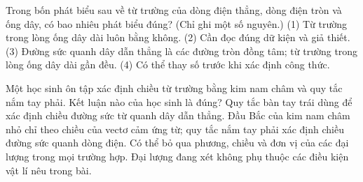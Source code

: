 \begin{ex}
Trong bốn phát biểu sau về từ trường của dòng điện thẳng, dòng điện tròn và ống dây, có bao nhiêu phát biểu đúng? (Chỉ ghi một số nguyên.) (1) Từ trường trong lòng ống dây dài luôn bằng không. (2) Cần đọc đúng dữ kiện và giả thiết. (3) Đường sức quanh dây dẫn thẳng là các đường tròn đồng tâm; từ trường trong lòng ống dây dài gần đều. (4) Có thể thay số trước khi xác định công thức.
\end{ex}

\begin{ex}
Một học sinh ôn tập xác định chiều từ trường bằng kim nam châm và quy tắc nắm tay phải. Kết luận nào của học sinh là đúng?
\choice
{Quy tắc bàn tay trái dùng để xác định chiều đường sức từ quanh dây dẫn thẳng.}
{\True Đầu Bắc của kim nam châm nhỏ chỉ theo chiều của vectơ cảm ứng từ; quy tắc nắm tay phải xác định chiều đường sức quanh dòng điện.}
{Có thể bỏ qua phương, chiều và đơn vị của các đại lượng trong mọi trường hợp.}
{Đại lượng đang xét không phụ thuộc các điều kiện vật lí nêu trong bài.}
\end{ex}

